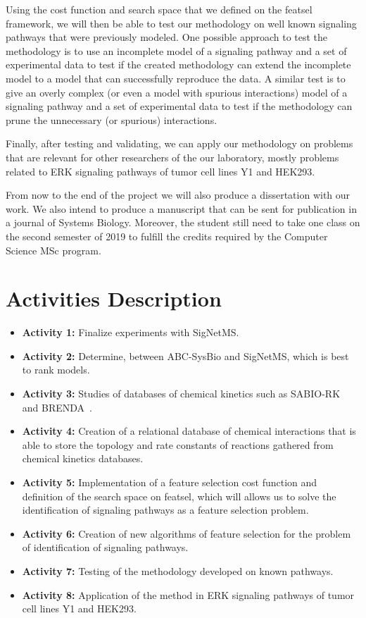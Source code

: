 Using the cost function and search space that we defined on the featsel
framework, we will then be able to test our methodology on well known
signaling pathways that were previously modeled. One possible approach 
to test the methodology is to use an incomplete model of a signaling 
pathway and a set of experimental data to test if the created 
methodology can extend the incomplete model to a model that can 
successfully reproduce the data. A similar test is to give an overly 
complex (or even a model with spurious interactions) model of a 
signaling pathway and a set of experimental data to test if the 
methodology can prune the unnecessary (or spurious) interactions. 

Finally, after testing and validating, we can apply our methodology on
problems that are relevant for other researchers of the our laboratory, 
mostly problems related to ERK signaling pathways of tumor cell lines
Y1 and HEK293.

From now to the end of the project we will also produce a dissertation
with our work. We also intend to produce a manuscript that can be sent 
for publication in a journal of Systems Biology. Moreover, the student
still need to take one class on the second semester of 2019 to fulfill
the credits required by the Computer Science MSc program. 


\section{Activities Description}
\label{sec:future_activities}
\begin{itemize}
    \item{\bf Activity 1:} Finalize experiments with SigNetMS.
    \item{\bf Activity 2:} Determine, between ABC-SysBio and SigNetMS,
        which is best to rank models.
    \item{\bf Activity 3:} Studies of databases of chemical kinetics 
        such as SABIO-RK~\cite{Wittig2011} and 
        BRENDA~\cite{Schomburg2004}.
    \item{\bf Activity 4:} Creation of a relational database of chemical 
        interactions that is able to store the topology and rate 
        constants of reactions gathered from chemical kinetics 
        databases.
    \item{\bf Activity 5:} Implementation of a feature selection cost
        function and definition of the search space on featsel, which 
        will allows us to solve the identification of signaling pathways 
        as a feature selection problem.
    \item{\bf Activity 6:} Creation of new algorithms of feature 
        selection for the problem of identification of signaling 
        pathways.
    \item{\bf Activity 7:} Testing of the methodology developed on known
        pathways.
    \item{\bf Activity 8:} Application of the method in ERK signaling 
        pathways of tumor cell lines Y1 and HEK293.
\end{itemize}

